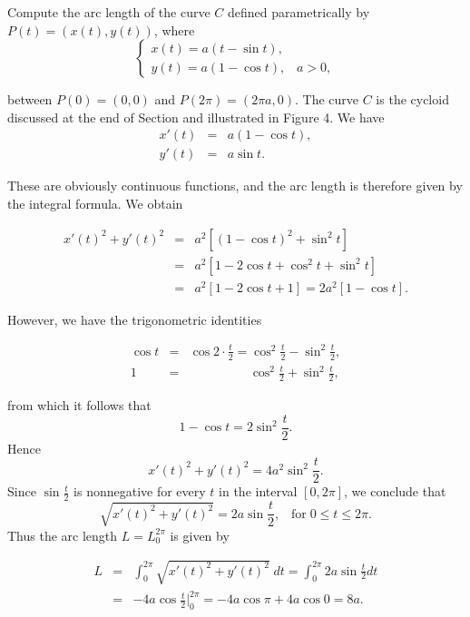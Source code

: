 \begin{example}
Compute the arc length of the curve $C$ defined parametrically by $P(t) = (x(t), y(t))$, where 
$$
\left \{ \begin{array}{l}
x(t) = a(t - \sin t),\\
y(t) = a(1 - \cos t), \;\;\;a > 0,
\end{array}
\right .
$$

\noindent between $P(0) = (0, 0)$ and $P(2\pi) = (2\pi a, 0)$. The curve $C$ is the cycloid discussed at the end of Section  and illustrated in Figure 4. We have 
\begin{eqnarray*}
x'(t) &=& a(1- \cos t), \\
y'(t) &=& a \sin t.
\end{eqnarray*}

\noindent These are obviously continuous functions, and the arc length is therefore given by the integral formula. We obtain


\begin{eqnarray*}
x'(t)^2 + y'(t)^2 &=& a^2[(1 - \cos t)^2 + \sin^2 t] \\
                        &=& a^2[1 - 2 \cos t + \cos^2 t + \sin^2 t] \\
                        &=& a^2[1 - 2 \cos t + 1 ] = 2a^2 [ 1 - \cos t]. 
\end{eqnarray*}

\noindent However, we have the trigonometric identities 

\begin{eqnarray*}
\cos t &=& \cos2 \cdot \frac{t}{2} = \cos^2 \frac{t}{2} - \sin^2 \frac{t}{2} , \\
       1 &=&  \;\;\;\;\;\;\;\;\;\;\;\;\;\;\;\;\; \cos^2 \frac{t}{2} + \sin^2\frac{t}{2} , 
\end{eqnarray*}

\noindent from which it follows that
$$
1 - \cos t = 2 \sin^2 \frac{t}{2} .
$$
\noindent Hence
$$
x'(t)^2 + y'(t)^2 = 4a^2 \sin^2 \frac{t}{2} . 
$$
\noindent Since $\sin \frac{t}{2}$ is nonnegative for every $t$ in the interval $[0, 2\pi]$, we conclude that 
$$
\sqrt{x'(t)^2 + y'(t)^2} = 2a \sin \frac{t}{2}, \;\;\;\mbox{for}\; 0 \leq t \leq 2\pi.
$$
\noindent Thus the arc length $L = L_0^{2\pi}$ is given by

\begin{eqnarray*}
L &=& \int_0^{2\pi} \sqrt{x'(t)^2 + y'(t)^2} \;dt = \int_0^{2\pi} 2a \sin \frac{t}{2} dt \\
&=& - 4a \cos \frac{t}{2} \Big|_0^{2\pi} = - 4a \cos \pi + 4a \cos 0 = 8a.
\end{eqnarray*}
\end{example}

